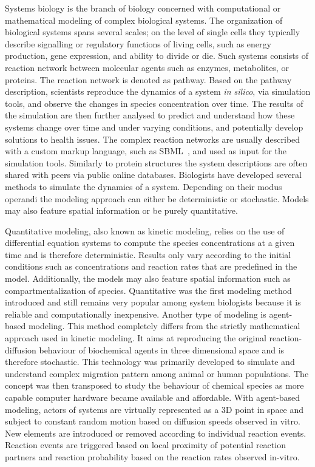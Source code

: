 Systems biology is the branch of biology concerned with computational or mathematical modeling of complex biological systems.
The organization of biological systems spans several scales; on the level of single cells they typically describe signalling or regulatory functions of living cells, such as energy production, gene expression, and ability to divide or die.
Such systems consists of reaction network between molecular agents such as enzymes, metabolites, or proteins.
The reaction network is denoted as pathway.
Based on the pathway description, scientists reproduce the dynamics of a system \textit{in silico}, via simulation tools, and observe the changes in species concentration over time.
The results of the simulation are then further analysed to predict and understand how these systems change over time and under varying conditions, and potentially develop solutions to health issues.
The complex reaction networks are usually described with a custom markup language, such as SBML~\cite{hucka2003systems}, and used as input for the simulation tools.
Similarly to protein structures the system descriptions are often shared with peers via public online databases.
Biologists have developed several methods to simulate the dynamics of a system.
Depending on their modus operandi the modeling approach can either be deterministic or stochastic.
Models may also feature spatial information or be purely quantitative. 

Quantitative modeling, also known as kinetic modeling, relies on the use of differential equation systems to compute the species concentrations at a given time and is therefore deterministic.
Results only vary according to the initial conditions such as concentrations and reaction rates that are predefined in the model.
Additionally, the models may also feature spatial information such as compartmentalization of species.
Quantitative was the first modeling method introduced and still remains very popular among system biologists because it is reliable and computationally inexpensive.
Another type of modeling is agent-based modeling.
This method completely differs from the strictly mathematical approach used in kinetic modeling.
It aims at reproducing the original reaction-diffusion behaviour of biochemical agents in three dimensional space and is therefore stochastic.
This technology was primarily developed to simulate and understand complex migration pattern among animal or human populations.
The concept was then transposed to study the behaviour of chemical species as more capable computer hardware became available and affordable.
With agent-based modeling, actors of systems are virtually represented as a 3D point in space and subject to constant random motion based on diffusion speeds observed in vitro.
New elements are introduced or removed according to individual reaction events.
Reaction events are triggered based on local proximity of potential reaction partners and reaction probability based on the reaction rates observed in-vitro.

